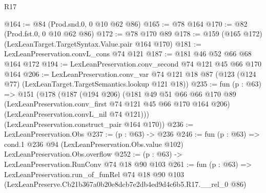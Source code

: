\begin{lexlean}{R17}
\begin{coremodule}
@164 := @84 (Prod.snd.{0, 0} @10 @62 @86)
@165 := @78 @164
@170 := @82 (Prod.fst.{0, 0} @10 @62 @86)
@172 := @78 @170 @89
@178 := @159 (@165 @172) (LexLeanTarget.TargetSyntax.Value.pair @164 @170)
@181 := LexLeanPreservation.convL_cons @74 @121
@187 := @181 @46 @52 @66 @68 @164 @172
@194 := LexLeanPreservation.conv_second @74 @121 @45 @66 @170 @164
@206 := LexLeanPreservation.conv_var
    @74
    @121
    @18
    @87
    (@123 (@124 @77) (LexLeanTarget.TargetSemantics.lookup @121 @18))
@235 := fun (p : @63) =>
  @151
    (@178
      (@187
        (@194 @206)
        (@181
          @49
          @51
          @66
          @66
          @170
          @89
          (LexLeanPreservation.conv_first @74 @121 @45 @66 @170 @164 @206)
          (LexLeanPreservation.convL_nil @74 @121)))
      (LexLeanPreservation.construct_pair @164 @170))
@236 := LexLeanPreservation.Obs
@237 := (p : @63) -> @236
@246 := fun (p : @63) =>
  cond.{1} @236 @94 (LexLeanPreservation.Obs.value @102) LexLeanPreservation.Obs.overflow
@252 := (p : @63) -> LexLeanPreservation.RunConv @74 @18 @90 @103
@261 := fun (p : @63) =>
  LexLeanPreservation.run_of_funRel
    @74
    @18
    @90
    @103
    (LexLeanPreserve.Cb21b367a0b20e8dcb7e2db4ed9d4c6b5.R17.__rel_0 @86)
\end{coremodule}
\end{lexlean}
